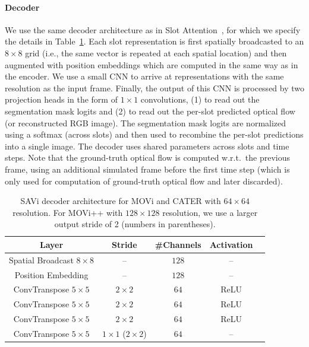 \documentclass{article}
\begin{document}
\paragraph{Decoder}
We use the same decoder architecture as in Slot Attention~\citep{locatello2020object}, for which we specify the details in Table~\ref{table:architecture_cnn_dec}. Each slot representation is first spatially broadcasted to an $8\times8$ grid (i.e., the same vector is repeated at each spatial location) and then augmented with position embeddings which are computed in the same way as in the encoder. We use a small CNN to arrive at representations with the same resolution as the input frame. Finally, the output of this CNN is processed by two projection heads in the form of $1\times1$ convolutions, (1) to read out the segmentation mask logits and (2) to read out the per-slot predicted optical flow (or reconstructed RGB image). The segmentation mask logits are normalized using a softmax (across slots) and then used to recombine the per-slot predictions into a single image. The decoder uses shared parameters across slots and time steps. Note that the ground-truth optical flow is computed w.r.t.~the previous frame, using an additional simulated frame before the first time step (which is only used for computation of ground-truth optical flow and later discarded).
\begin{table}[htp!]
\centering
\caption{SAVi decoder architecture for MOVi and CATER with $64\times64$ resolution. For MOVi++ with $128\times128$ resolution, we use a larger output stride of 2 (numbers in parentheses).}
\begin{tabular}{ccccc}
\toprule
Layer & Stride & \#Channels & Activation \\
\midrule 
Spatial Broadcast $8\times 8$ & -- & $128$ & --\\
Position Embedding & -- & $128$ & --\\
ConvTranspose $5\times 5$ & $2\times 2$ & $64$ & ReLU\\
ConvTranspose  $5\times 5$ & $2\times 2$ & $64$ & ReLU\\
ConvTranspose $5\times 5$ & $2\times 2$ & $64$ & ReLU\\
ConvTranspose  $5\times 5$ & $1\times 1$ ($2\times 2$) & $64$ & --\\
\bottomrule
\end{tabular}
\label{table:architecture_cnn_dec}
\end{table}
\end{document}
